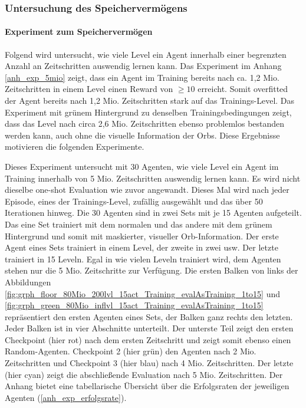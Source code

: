 \subsubsection{Untersuchung des Speichervermögens}

\paragraph{Experiment zum Speichervermögen}\label{par:durch_EXP_farbÄnd_Speichervermögen}
Folgend wird untersucht, wie viele Level ein Agent innerhalb einer begrenzten Anzahl an Zeitschritten auswendig lernen kann. Das Experiment im Anhang \ref{anh_exp_5mio} zeigt, dass ein Agent im Training bereits nach ca. 1,2 Mio. Zeitschritten in einem Level einen Reward von $ \geq 10$ erreicht. Somit overfitted der Agent bereits nach 1,2 Mio. Zeitschritten stark auf das Trainings-Level. Das Experiment mit grünem Hintergrund zu denselben Trainingsbedingungen zeigt, dass das Level nach circa 2,6 Mio. Zeitschritten ebenso problemlos bestanden werden kann, auch ohne die visuelle Information der Orbs. Diese Ergebnisse motivieren die folgenden Experimente.

Dieses Experiment untersucht mit 30 Agenten, wie viele Level ein Agent im Training innerhalb von 5 Mio. Zeitschritten auswendig lernen kann. Es wird nicht dieselbe one-shot Evaluation wie zuvor angewandt. Dieses Mal wird nach jeder Episode, eines der Trainings-Level, zufällig ausgewählt und das über 50 Iterationen hinweg. Die 30 Agenten sind in zwei Sets mit je 15 Agenten aufgeteilt. Das eine Set trainiert mit dem normalen und das andere mit dem grünem Hintergrund und somit mit maskierter, visueller Orb-Information. Der erste Agent eines Sets trainiert in einem Level, der zweite in zwei usw. Der letzte trainiert in 15 Leveln. Egal in wie vielen Leveln trainiert wird, dem Agenten stehen nur die 5 Mio. Zeitschritte zur Verfügung. Die ersten Balken von links der Abbildungen \ref{fig:grph_floor_80Mio_200lvl_15act_Training_evalAsTraining_1to15} und \ref{fig:grph_green_80Mio_inflvl_15act_Training_evalAsTraining_1to15} repräsentiert den ersten Agenten eines Sets, der Balken ganz rechts den letzten. Jeder Balken ist in vier Abschnitte unterteilt. Der unterste Teil zeigt den ersten Checkpoint (hier rot) nach dem ersten Zeitschritt und zeigt somit ebenso einen Random-Agenten. Checkpoint 2 (hier grün) den Agenten nach 2 Mio. Zeitschritten und Checkpoint 3 (hier blau) nach 4 Mio. Zeitschritten. Der letzte (hier cyan) zeigt die abschließende Evaluation nach 5 Mio. Zeitschritten. Der Anhang bietet eine tabellarische Übersicht über die Erfolgsraten der jeweiligen Agenten (\ref{anh_exp_erfolgsrate}). 

